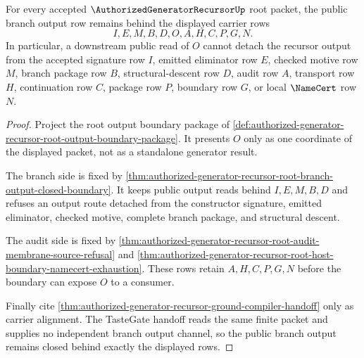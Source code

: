 \begin{theorem}
\label{thm:authorized-generator-recursor-branch-output-closure-row}
For every accepted $\AuthorizedGeneratorRecursorUp$ root packet, the public branch output row remains behind the displayed carrier rows
$$
I,E,M,B,D,O,A,H,C,P,G,N.
$$
In particular, a downstream public read of $O$ cannot detach the recursor output from the accepted signature row $I$, emitted eliminator row $E$, checked motive row $M$, branch package row $B$, structural-descent row $D$, audit row $A$, transport row $H$, continuation row $C$, package row $P$, boundary row $G$, or local $\NameCert$ row $N$.
\end{theorem}
\begin{proof}
Project the root output boundary package of \autoref{def:authorized-generator-recursor-root-output-boundary-package}. It presents $O$ only as one coordinate of the displayed packet, not as a standalone generator result.

The branch side is fixed by \autoref{thm:authorized-generator-recursor-root-branch-output-closed-boundary}. It keeps public output reads behind $I,E,M,B,D$ and refuses an output route detached from the constructor signature, emitted eliminator, checked motive, complete branch package, and structural descent.

The audit side is fixed by \autoref{thm:authorized-generator-recursor-root-audit-membrane-source-refusal} and \autoref{thm:authorized-generator-recursor-root-host-boundary-namecert-exhaustion}. These rows retain $A,H,C,P,G,N$ before the boundary can expose $O$ to a consumer.

Finally cite \autoref{thm:authorized-generator-recursor-ground-compiler-handoff} only as carrier alignment. The TasteGate handoff reads the same finite packet and supplies no independent branch output channel, so the public branch output remains closed behind exactly the displayed rows.
\end{proof}

